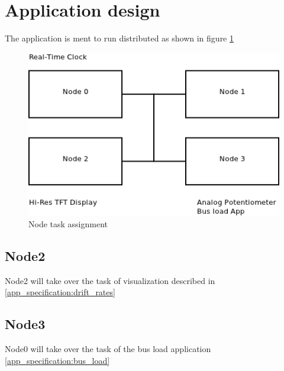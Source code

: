 \section{Application design}

The application is ment to run distributed 
as shown in figure \ref{fig:node_task_assignment} 

\begin{figure}[ht]
 \centering
 \includegraphics[scale=0.8]{../images/node_tasks.png}
 \caption{Node task assignment}
 \label{fig:node_task_assignment}
\end{figure}


\subsection{Node2}
Node2 will take over the task of visualization described in
\ref{app_specification:drift_rates} 

\subsection{Node3}
Node0 will take over the task of the bus load application
\ref{app_specification:bus_load} 